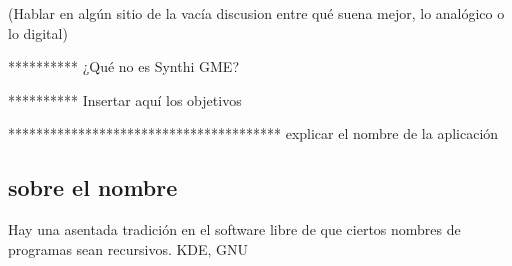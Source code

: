 (Hablar en algún sitio de la vacía discusion entre qué suena mejor, lo analógico o lo digital)

**********
¿Qué no es Synthi GME?

**********
Insertar aquí los objetivos


***************************************
explicar el nombre de la aplicación



\subsection{sobre el nombre \appName}

Hay una asentada tradición en el software libre de que ciertos nombres de programas sean recursivos. KDE, GNU